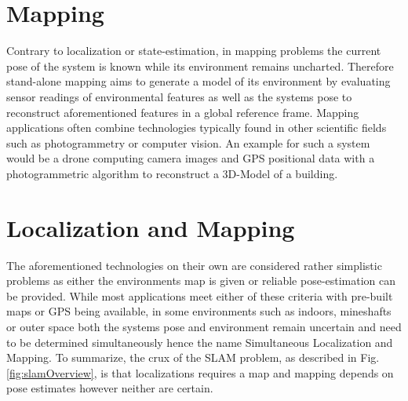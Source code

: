 \section{Mapping}
Contrary to localization or state-estimation, in mapping problems the current pose of the system is known while its environment remains uncharted.
Therefore stand-alone mapping aims to generate a model of its environment by evaluating sensor readings of environmental features as well as the systems pose to reconstruct aforementioned features in a global reference frame. 
Mapping applications often combine technologies typically found in other scientific fields such as photogrammetry or computer vision.
An example for such a system would be a drone computing camera images and GPS positional data with a photogrammetric algorithm to reconstruct a 3D-Model of a building. 


\section{Localization and Mapping}
The aforementioned technologies on their own are considered rather simplistic problems as either the environments map is given or reliable pose-estimation can be provided. While most applications meet either of these criteria with pre-built maps or GPS being available, in some environments such as indoors, mineshafts or outer space both the systems pose and environment remain uncertain and need to be determined simultaneously hence the name Simultaneous Localization and Mapping. 
To summarize, the crux of the SLAM problem, as described in Fig. \ref{fig:slamOverview}, is that localizations requires a map and mapping depends on pose estimates however neither are certain.





